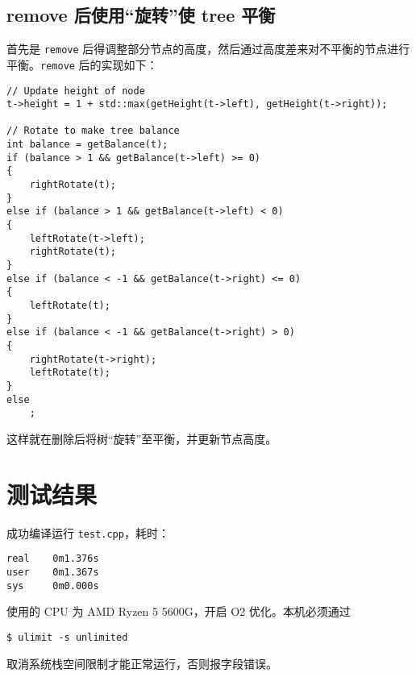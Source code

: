 \documentclass[UTF8, a4paper, 12pt]{ctexart}
\begin{document}
\subsection{remove 后使用“旋转”使 tree 平衡}
首先是 \verb|remove| 后得调整部分节点的高度，然后通过高度差来对不平衡的节点进行平衡。\verb|remove| 后的实现如下：

\begin{lstlisting}
// Update height of node
t->height = 1 + std::max(getHeight(t->left), getHeight(t->right));

// Rotate to make tree balance
int balance = getBalance(t);
if (balance > 1 && getBalance(t->left) >= 0)
{
    rightRotate(t);
}
else if (balance > 1 && getBalance(t->left) < 0)
{
    leftRotate(t->left);
    rightRotate(t);
}
else if (balance < -1 && getBalance(t->right) <= 0)
{
    leftRotate(t);
}
else if (balance < -1 && getBalance(t->right) > 0)
{
    rightRotate(t->right);
    leftRotate(t);
}
else
    ;
\end{lstlisting}

这样就在删除后将树“旋转”至平衡，并更新节点高度。

\section{测试结果}

成功编译运行 \verb|test.cpp|，耗时：

\begin{verbatim}
real    0m1.376s
user    0m1.367s
sys     0m0.000s
\end{verbatim}

使用的 CPU 为 AMD Ryzen 5 5600G，开启 O2 优化。本机必须通过

\begin{verbatim}
$ ulimit -s unlimited
\end{verbatim}

取消系统栈空间限制才能正常运行，否则报字段错误。
\end{document}
